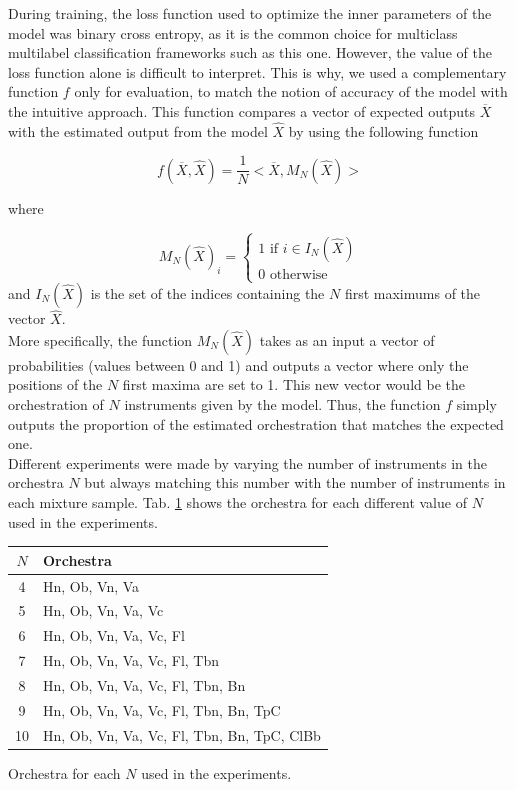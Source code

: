 \documentclass{article}
\begin{document}
During training, the loss function used to optimize the inner parameters of the model was binary cross entropy, as it is the common choice for multiclass multilabel classification frameworks such as this one. However, the value of the loss function alone is difficult to interpret. This is why, we used a complementary function $f$ only for evaluation, to match the notion of accuracy of the model with the intuitive approach. This function compares a vector of expected outputs $\overline{X}$ with the estimated output from the model $\hat{X}$ by using the following function

\begin{equation}
f(\overline{X}, \hat{X}) = \frac{1}{N}<\overline{X}, M_N(\hat{X})>
\label{eval}
\end{equation}

where

\begin{equation}
M_N(\hat{X})_i = \left\{\begin{array}{ll}
1 \text{ if } i \in I_N(\hat{X})\\
0 \text{ otherwise}
\end{array}\right.
\label{NMax}
\end{equation}
and $I_N(\hat{X})$ is the set of the indices containing the $N$ first maximums of the vector $\hat{X}$.\\

More specifically, the function $M_N(\hat{X})$ takes as an input a vector of probabilities (values between 0 and 1) and outputs a vector where only the positions of the $N$ first maxima are set to 1. This new vector would be the orchestration of $N$ instruments given by the model. Thus, the function $f$ simply outputs the proportion of the estimated orchestration that matches the expected one.\\

Different experiments were made by varying the number of instruments in the orchestra $N$ but always matching this number with the number of instruments in each mixture sample. Tab. \ref{exp_tab} shows the orchestra for each different value of $N$ used in the experiments.\\

\begin{table}
\begin{tabular}{|c|l|}
\hline
$N$ & Orchestra\\
\hline
4 & Hn, Ob, Vn, Va\\
5 & Hn, Ob, Vn, Va, Vc\\
6 & Hn, Ob, Vn, Va, Vc, Fl\\
7 & Hn, Ob, Vn, Va, Vc, Fl, Tbn\\
8 & Hn, Ob, Vn, Va, Vc, Fl, Tbn, Bn\\
9 & Hn, Ob, Vn, Va, Vc, Fl, Tbn, Bn, TpC\\
10 & Hn, Ob, Vn, Va, Vc, Fl, Tbn, Bn, TpC, ClBb\\
\hline
\end{tabular}

\begin{caption}
Orchestra for each $N$ used in the experiments.
\label{exp_tab}
\end{caption}
\end{table}
\end{document}
